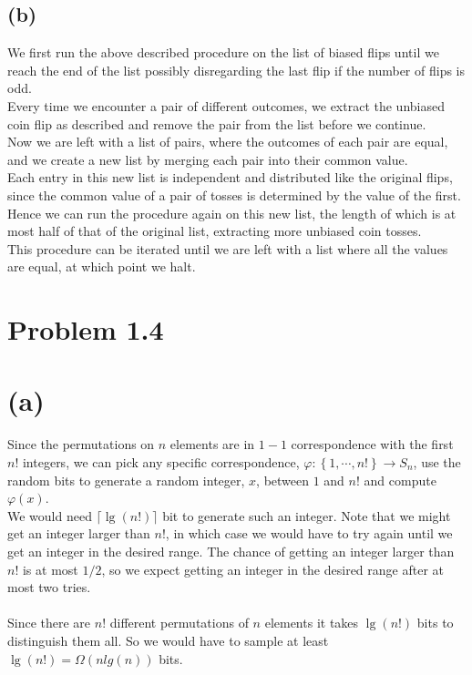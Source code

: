 \subsection*{(b)}
We first run the above described procedure on the list of biased flips until we reach the end of the list
possibly disregarding the last flip if the number of flips is odd. \\
Every time we encounter a pair of different outcomes, we extract the unbiased coin flip as described and remove the pair from the list
before we continue. \\
Now we are left with a list of pairs, where the outcomes of each pair are equal,
and we create a new list by merging each pair into their common value. \\
Each entry in this new list is independent and distributed like the original flips,
since the common value of a pair of tosses is determined by the value of the first. 
Hence we can run the procedure again on this new list, the length of which is at most half of that of the original list, 
extracting more unbiased coin tosses. \\
This procedure can be iterated until we are left with a list where all the values are equal,
at which point we halt.
\section*{Problem 1.4}
\section*{(a)}
Since the permutations on $n$ elements are in $1-1$ correspondence with the first $n!$ integers,
we can pick any specific correspondence, $\varphi:\left\{1,\cdots,n!\right\} \to S_n$, 
use the random bits to generate a random integer, $x$, between $1$ and $n!$
and compute $\varphi(x)$. \\
We would need $\lceil{\lg(n!)}\rceil$ bit to generate such an integer.
Note that we might get an integer larger than $n!$,
in which case we would have to try again until we get an integer in the desired range.
The chance of getting an integer larger than $n!$ is at most $1/2$, 
so we expect getting an integer in the desired range after at most two tries. \\ \\
Since there are $n!$ different permutations of $n$ elements it takes $\lg(n!)$ bits to distinguish them all.
So we would have to sample at least $\lg(n!)=\Omega(n lg(n))$ bits.
